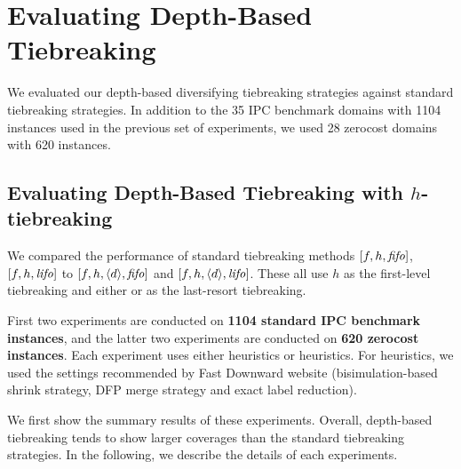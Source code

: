 % 
% 
% 
% 
% 

% 


\section{Evaluating Depth-Based Tiebreaking}
\label{sec:depth-based-evaluation}
We evaluated our depth-based diversifying tiebreaking strategies against standard
tiebreaking strategies.
In addition to the 35 IPC benchmark domains with 1104 instances used in
the previous set of experiments, we used 28 zerocost domains with 620
instances.

\subsection{Evaluating Depth-Based Tiebreaking with $h$-tiebreaking}

We compared the performance of standard tiebreaking methods $[f,h,{\mbox{\textit{fifo}}}]$,
$[f,h,{\mbox{\textit{lifo}}}]$ to $[f,h,{\left<d\right>},{\mbox{\textit{fifo}}}]$ and
$[f,h,{\left<d\right>},{\mbox{\textit{lifo}}}]$.  These all use $h$ as the first-level
tiebreaking and either \fifo or \lifo as the last-resort tiebreaking.

First two experiments are conducted on \textbf{1104 standard IPC
benchmark instances}, and the latter two experiments are conducted on
\textbf{620 zerocost instances}.  Each experiment uses either \lmcut
heuristics or \mands heuristics.  For \mands heuristics, we used the
settings recommended by Fast Downward website (bisimulation-based shrink
strategy, DFP merge strategy and exact label reduction).

We first show the summary results of these experiments.
Overall, depth-based tiebreaking tends to show larger coverages than the
standard tiebreaking strategies. In the following, we describe the
details of each experiments.


